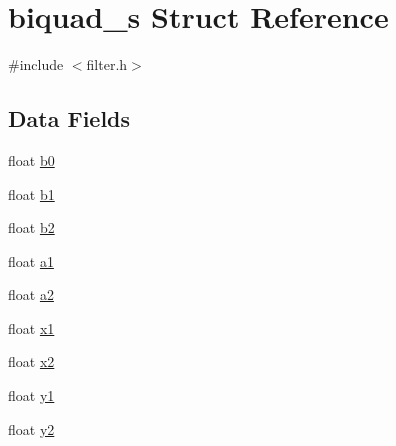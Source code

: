 \hypertarget{structbiquad__s}{\section{biquad\+\_\+s Struct Reference}
\label{structbiquad__s}
}


{\ttfamily \#include $<$filter.\+h$>$}

\subsection*{Data Fields}
\begin{DoxyCompactItemize}
\item 
float \hyperlink{structbiquad__s_a4ca1d615a6a8b60fe1b922f7e4fe3157}{b0}
\item 
float \hyperlink{structbiquad__s_ab6b878a198e2c4c0298ff1f8503fe663}{b1}
\item 
float \hyperlink{structbiquad__s_ab42706633fb9f58ea78f04e24f382ef1}{b2}
\item 
float \hyperlink{structbiquad__s_ae4bab49f2a8e198ed07d157a0be93e34}{a1}
\item 
float \hyperlink{structbiquad__s_a40c875a1cdc17e203a1be3756e5f9487}{a2}
\item 
float \hyperlink{structbiquad__s_a9b493229979418fefaf143e58cd47e10}{x1}
\item 
float \hyperlink{structbiquad__s_ab981dbea07294e6fe8a35f9e3b999a87}{x2}
\item 
float \hyperlink{structbiquad__s_af071236ec3dfc181f966f5fe99421123}{y1}
\item 
float \hyperlink{structbiquad__s_a2c4d8c8f4d1548d5e4d06521c9f303b4}{y2}
\end{DoxyCompactItemize}


